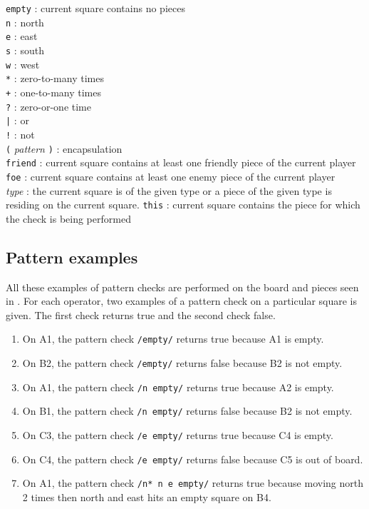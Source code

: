 \texttt{empty} : current square contains no pieces\\
\texttt{n} : north \\
\texttt{e} : east \\
\texttt{s} : south \\
\texttt{w} : west \\
\texttt{*} : zero-to-many times\\
\texttt{+} : one-to-many times\\
\texttt{?} : zero-or-one time\\
\texttt{|} : or\\
\texttt{!} : not\\
\texttt{(} \textit{pattern} \texttt{)} : encapsulation\\
\texttt{friend} :  current square contains at least one friendly piece of the current player\\
\texttt{foe} : current square contains at least one enemy piece of the current player\\
\textit{type} : the current square is of the given type or a piece of the given
type is residing on the current square.
\texttt{this} : current square contains the piece for which the check is being performed\\

\subsection{Pattern examples}
\label{sec:patternexamples}
All these examples of pattern checks are performed on the board and pieces seen
in . For each operator, two examples of a pattern check on
a particular square is given. The first check returns true and the second check
false.

\begin{enumerate}[noitemsep]
\item On A1, the pattern check \texttt{/empty/} returns true because A1 is empty.
\item On B2, the pattern check \texttt{/empty/} returns false because B2 is not empty.
\item On A1, the pattern check \texttt{/n empty/} returns true because A2 is empty.
\item On B1, the pattern check \texttt{/n empty/} returns false because B2 is not empty.
\item On C3, the pattern check \texttt{/e empty/} returns true because C4 is empty.
\item On C4, the pattern check \texttt{/e empty/} returns false because C5 is out of board.
\item On A1, the pattern check \texttt{/n* n e empty/} returns true because
  moving north 2 times then north and east hits an empty square on B4.
\end{enumerate}

